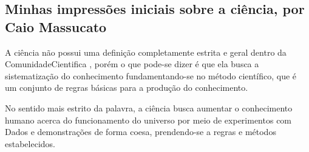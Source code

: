 \subsection{Minhas impressões iniciais sobre a ciência, por Caio Massucato}


A ciência não possui uma definição completamente estrita e geral dentro da \gls{ComunidadeCientifica} \citep{schwartzman_ciencia_1984}, porém o que pode-se dizer é que ela busca a sistematização do conhecimento fundamentando-se no método científico, que é um conjunto de regras básicas para a produção do conhecimento.

No sentido mais estrito da palavra, a ciência busca aumentar o conhecimento humano acerca do funcionamento do universo por meio de experimentos com \gls{Dados} e demonstrações de forma coesa, prendendo-se a regras e métodos estabelecidos.